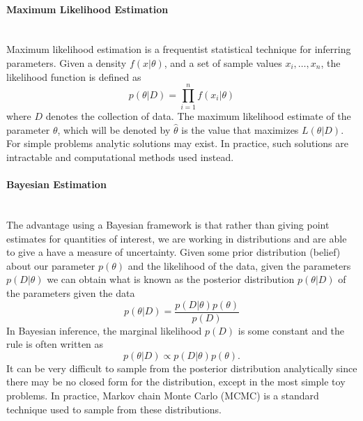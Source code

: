 \paragraph{Maximum Likelihood Estimation} ~\\
\noindent Maximum likelihood estimation is a frequentist statistical technique for inferring parameters. Given a density $f(x|\theta)$, and a set of sample values $x_i,\ldots,x_n$, the likelihood function is defined as  
	\begin{equation}
		p(\theta|D) = \prod_{i=1}^{n}f(x_i|\theta)
	\end{equation}
where $D$ denotes the collection of data. The maximum likelihood estimate of the parameter $\theta$, which will be denoted by $\hat{\theta}$ is the value that maximizes $L(\theta|D)$. For simple problems analytic solutions may exist. In practice, such solutions are intractable and computational methods used instead.

\paragraph{Bayesian Estimation}~\\
\noindent The advantage using a Bayesian framework is that rather than giving point estimates for quantities of interest, we are working in distributions and are able to give a have a measure of uncertainty. Given some prior distribution (belief) about our parameter $p(\theta)$ and the likelihood of the data, given the parameters $p(D|\theta)$ we can obtain what is known as the posterior distribution $ p(\theta|D)$ of the parameters given the data 
    \begin{equation}
        p(\theta|D) = \frac{p(D|\theta)p(\theta)}{p(D)}
    \end{equation}
In Bayesian inference, the marginal likelihood $p(D)$ is some constant and the rule is often written as 
    \begin{equation}
        p(\theta|D) \propto p(D|\theta)p(\theta).
    \end{equation}
It can be very difficult to sample from the posterior distribution analytically since there may be no closed form for the distribution, except in the most simple toy problems. In practice, Markov chain Monte Carlo (MCMC) is a standard technique used to sample from these distributions. 


